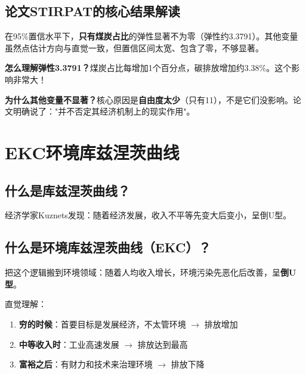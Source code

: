 \documentclass[12pt, a4paper]{article}
\begin{document}
\subsection{论文STIRPAT的核心结果解读}

\begin{purplebox}
在95\%置信水平下，\textbf{只有煤炭占比}的弹性显著不为零（弹性约3.3791）。其他变量虽然点估计方向与直觉一致，但置信区间太宽、包含了零，不够显著。

\textbf{怎么理解弹性3.3791？}煤炭占比每增加1个百分点，碳排放增加约3.38\%。这个影响非常大！

\textbf{为什么其他变量不显著？}核心原因是\textbf{自由度太少}（只有11），不是它们没影响。论文明确说了："并不否定其经济机制上的现实作用"。
\end{purplebox}

\section{EKC环境库兹涅茨曲线}

\subsection{什么是库兹涅茨曲线？}

\begin{conceptbox}
经济学家Kuznets发现：随着经济发展，收入不平等先变大后变小，呈倒U型。
\end{conceptbox}

\subsection{什么是环境库兹涅茨曲线（EKC）？}

\begin{conceptbox}[EKC假说]
把这个逻辑搬到环境领域：随着人均收入增长，环境污染先恶化后改善，呈\textbf{倒U型}。
\end{conceptbox}

直觉理解：
\begin{enumerate}[leftmargin=2em]
\item \textbf{穷的时候}：首要目标是发展经济，不太管环境 $\to$ 排放增加
\item \textbf{中等收入时}：工业高速发展 $\to$ 排放达到最高
\item \textbf{富裕之后}：有财力和技术来治理环境 $\to$ 排放下降
\end{enumerate}
\end{document}
